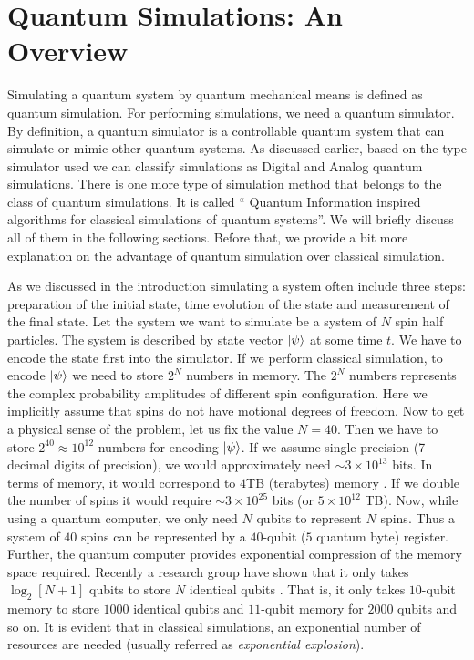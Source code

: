 \documentclass[12pt,a4paper]{report}
\begin{document}
\newpage
\thispagestyle{empty}
\mbox{}
\newpage
\chapter{Quantum Simulations: An Overview}\label{sec1}

Simulating a quantum system by quantum mechanical means is defined as quantum simulation. For performing simulations, we need a quantum simulator.  By definition, a quantum simulator is a controllable quantum system that can simulate or mimic other quantum systems. As discussed earlier, based on the type simulator used we can classify simulations as Digital and Analog quantum simulations. There is one more type of simulation method that belongs to the class of quantum simulations. It is called “ Quantum Information inspired algorithms for classical simulations of quantum systems”. We will briefly discuss all of them in the following sections. Before that, we provide a bit more explanation on the advantage of quantum simulation over classical simulation.

As we discussed in the introduction simulating a system often include three steps: preparation of the initial state, time evolution of the state and measurement of the final state. Let the system we want to simulate be a system of $N$ spin half particles. The system is described by state vector $\ket{\psi}$ at some time $t$. We have to encode the state first into the simulator.  If we perform classical simulation, to encode $\ket{\psi}$ we need to store $2^{N}$ numbers in memory. The $2^{N}$ numbers represents the complex probability amplitudes of different spin configuration. Here we implicitly assume that spins do not have motional degrees of freedom. Now to get a physical sense of the problem, let us fix the value $N=40$. Then we have to store $2^{40} \approx 10^{12}$ numbers for encoding $\ket{\psi}$. If we assume single-precision (7 decimal digits of precision), we would approximately need $\sim 3 \times 10^{13}$ bits. In terms of memory, it would correspond to $4$TB (terabytes) memory \cite{lloyd}\cite{georgescu}. If we double the number of spins it would require $\sim 3 \times 10^{25}$ bits (or $5 \times 10^{12}$ TB). Now, while using a quantum computer, we only need $N$ qubits to represent $N$ spins. Thus a system of $40$ spins can be represented by a $40$-qubit ($5$ quantum byte) register. Further, the quantum computer provides exponential compression of the memory space required. Recently a research group have shown that it only takes $\log_{2} [N+1]$ qubits to store $N$ identical qubits \cite{rozema}. That is, it only takes $10$-qubit memory to store $1000$ identical qubits and $11$-qubit memory for $2000$ qubits and so on. It is evident that in classical simulations, an exponential number of resources are needed (usually referred as \emph{exponential explosion}).
\end{document}
